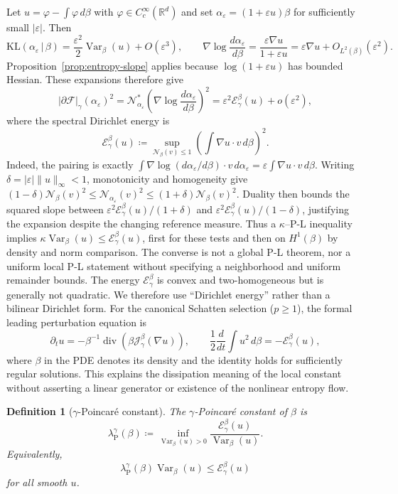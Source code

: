 \documentclass{article}
\newtheorem{definition}[theorem]{Definition}
\newcommand{\R}{\mathbb{R}}
\newcommand{\MF}{\mathcal{F}}
\newcommand{\MN}{\mathcal{N}}
\newcommand{\MJ}{\mathcal{J}}
\newcommand{\divv}{\operatorname{div}}
\newcommand{\KL}{\mathrm{KL}}
\begin{document}
Let $u=\varphi-\int\varphi\,d\beta$ with
$\varphi\in C_c^\infty(\R^d)$ and set
$\alpha_\varepsilon=(1+\varepsilon u)\beta$ for sufficiently small
$|\varepsilon|$.  Then
\[
    \KL(\alpha_\varepsilon\,|\,\beta)
    =
    \frac{\varepsilon^2}{2}\operatorname{Var}_\beta(u)
    +O(\varepsilon^3),
    \qquad
    \nabla\log\frac{d\alpha_\varepsilon}{d\beta}
    =
    \frac{\varepsilon\nabla u}{1+\varepsilon u}
    =\varepsilon\nabla u+O_{L^2(\beta)}(\varepsilon^2).
\]
Proposition~\ref{prop:entropy-slope} applies because
$\log(1+\varepsilon u)$ has bounded Hessian. These expansions therefore give
\[
    |\partial\MF|_\gamma(\alpha_\varepsilon)^2
    =\MN_{\alpha_\varepsilon}^*\!\left(
      \nabla\log\frac{d\alpha_\varepsilon}{d\beta}\right)^2
    =
    \varepsilon^2\mathcal E_\gamma^\beta(u)+o(\varepsilon^2),
\]
where the spectral Dirichlet energy is
\[
    \mathcal E_\gamma^\beta(u)
    \coloneqq
    \sup_{\MN_\beta(v)\le1}
    \left(\int \nabla u\cdot v\,d\beta\right)^2 .
\]
Indeed, the pairing is exactly
$\int\nabla\log(d\alpha_\varepsilon/d\beta)\cdot v\,d\alpha_\varepsilon
=\varepsilon\int\nabla u\cdot v\,d\beta$.
Writing $\delta=|\varepsilon|\|u\|_\infty<1$, monotonicity and homogeneity give
$(1-\delta)\MN_\beta(v)^2\le\MN_{\alpha_\varepsilon}(v)^2
\le(1+\delta)\MN_\beta(v)^2$. Duality then bounds the squared slope between
$\varepsilon^2\mathcal E_\gamma^\beta(u)/(1+\delta)$ and
$\varepsilon^2\mathcal E_\gamma^\beta(u)/(1-\delta)$, justifying the expansion
despite the changing reference measure.
Thus a $\kappa$--P-L inequality implies
$\kappa\operatorname{Var}_\beta(u)\le\mathcal E_\gamma^\beta(u)$, first for
these tests and then on $H^1(\beta)$ by density and norm comparison.
The converse is not a global P-L theorem, nor a uniform local P-L statement
without specifying a neighborhood and uniform remainder bounds.
The energy $\mathcal E_\gamma^\beta$ is convex and two-homogeneous but is
generally not quadratic. We therefore use ``Dirichlet energy'' rather than
a bilinear Dirichlet form. For the canonical Schatten selection ($p\ge1$),
the formal leading perturbation equation is
\[
 \partial_tu=-\beta^{-1}\divv\!\left(
       \beta\MJ_\gamma^\beta(\nabla u)\right),
 \qquad
 \frac12\frac{d}{dt}\int u^2\,d\beta=-\mathcal E_\gamma^\beta(u),
\]
where $\beta$ in the PDE denotes its density and the identity holds for
sufficiently regular solutions. This explains the dissipation meaning of
the local constant without asserting a linear generator or existence of
the nonlinear entropy flow.

\begin{definition}[$\gamma$-Poincar\'e constant]
The $\gamma$-Poincar\'e constant of $\beta$ is
\[
    \lambda_{\mathrm P}^\gamma(\beta)
    \coloneqq
    \inf_{\operatorname{Var}_\beta(u)>0}
    \frac{\mathcal E_\gamma^\beta(u)}
         {\operatorname{Var}_\beta(u)} .
\]
Equivalently,
\[
    \lambda_{\mathrm P}^\gamma(\beta)\operatorname{Var}_\beta(u)
    \le
    \mathcal E_\gamma^\beta(u)
\]
for all smooth $u$.
\end{definition}
\end{document}

